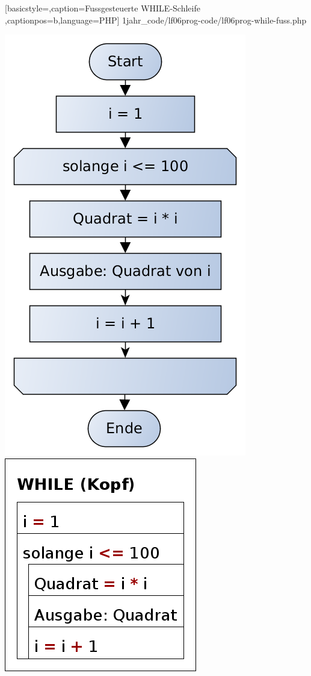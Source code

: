 
	[basicstyle=\small,caption={Fussgesteuerte WHILE-Schleife}
	\label{lst:while-fuss},captionpos=b,language=PHP]
	{1jahr_code/lf06prog-code/lf06prog-while-fuss.php}

\includegraphics[scale=0.4]{1jahr_pictures/lf06prog-pic/lf06prog-while-kopf-pap.png}
\includegraphics[scale=0.4]{1jahr_pictures/lf06prog-pic/lf06prog-while-kopf-struct.png}

